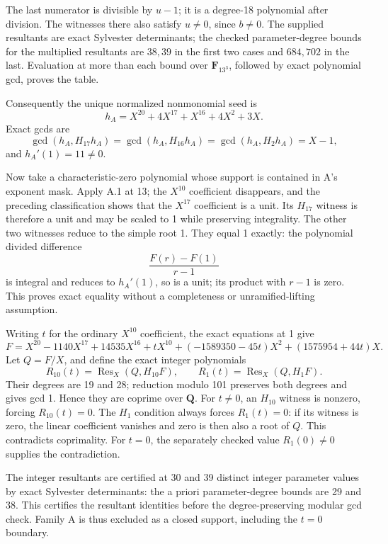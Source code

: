 \documentclass[
  british,
  10pt,
  a4paper,
]{article}
\begin{document}
The last numerator is divisible by \(u-1\); it is a degree-18 polynomial
after division. The witnesses there also satisfy \(u\ne0\), since
\(b\ne0\). The supplied resultants are exact Sylvester determinants; the
checked parameter-degree bounds for the multiplied resultants are
\(38,39\) in the first two cases and \(684,702\) in the last. Evaluation
at more than each bound over \(\mathbf F_{13^3}\), followed by exact
polynomial gcd, proves the table.

Consequently the unique normalized nonmonomial seed is \[
h_A=X^{20}+4X^{17}+X^{16}+4X^2+3X.
\] Exact gcds are \[
\gcd(h_A,H_{17}h_A)=\gcd(h_A,H_{16}h_A)
=\gcd(h_A,H_2h_A)=X-1,
\] and \(h_A'(1)=11\ne0\).

Now take a characteristic-zero polynomial whose support is contained in
A's exponent mask. Apply A.1 at 13; the \(X^{10}\) coefficient
disappears, and the preceding classification shows that the \(X^{17}\)
coefficient is a unit. Its \(H_{17}\) witness is therefore a unit and
may be scaled to 1 while preserving integrality. The other two witnesses
reduce to the simple root 1. They equal 1 exactly: the polynomial
divided difference \[
\frac{F(r)-F(1)}{r-1}
\] is integral and reduces to \(h_A'(1)\), so is a unit; its product
with \(r-1\) is zero. This proves exact equality without a completeness
or unramified-lifting assumption.

Writing \(t\) for the ordinary \(X^{10}\) coefficient, the exact
equations at 1 give \[
F=X^{20}-1140X^{17}+14535X^{16}+tX^{10}
  +(-1589350-45t)X^2+(1575954+44t)X.
\tag{S13}
\] Let \(Q=F/X\), and define the exact integer polynomials \[
R_{10}(t)=\operatorname{Res}_X(Q,H_{10}F),\qquad
R_1(t)=\operatorname{Res}_X(Q,H_1F).
\] Their degrees are 19 and 28; reduction modulo 101 preserves both
degrees and gives gcd 1. Hence they are coprime over \(\mathbf Q\). For
\(t\ne0\), an \(H_{10}\) witness is nonzero, forcing \(R_{10}(t)=0\).
The \(H_1\) condition always forces \(R_1(t)=0\): if its witness is
zero, the linear coefficient vanishes and zero is then also a root of
\(Q\). This contradicts coprimality. For \(t=0\), the separately checked
value \(R_1(0)\ne0\) supplies the contradiction.

The integer resultants are certified at 30 and 39 distinct integer
parameter values by exact Sylvester determinants: the a priori
parameter-degree bounds are 29 and 38. This certifies the resultant
identities before the degree-preserving modular gcd check. Family A is
thus excluded as a closed support, including the \(t=0\) boundary.
\end{document}
